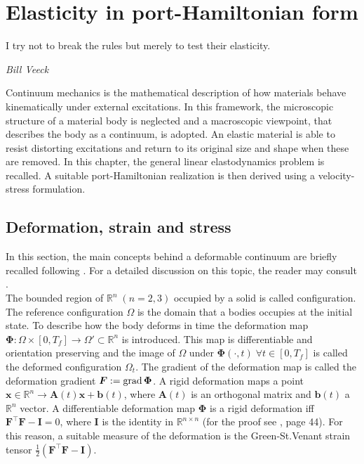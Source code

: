 \chapter{Elasticity in port-Hamiltonian form}

\epigraph{I try not to break the rules but merely to test their elasticity.}{\textit{Bill Veeck}}
\minitoc

Continuum mechanics is the mathematical description of how materials behave kinematically under external excitations. In this framework, the microscopic structure of a material body is neglected and a macroscopic viewpoint, that describes the body as a continuum, is adopted. An elastic material is able to resist distorting excitations and return to its original size and shape when these are removed. In this chapter, the general linear elastodynamics problem is recalled. A suitable port-Hamiltonian realization is then derived using a velocity-stress formulation.

\section{Deformation, strain and stress}
In this section, the main concepts behind a deformable continuum are briefly recalled following \cite{lee2012mixed}. For a detailed discussion on this topic, the reader may consult \cite{heinbockel2001introduction,landau2012elasticity}. \\

The bounded region of $\mathbb{R}^n \; (n=2, 3)$ occupied by a solid is called configuration. The reference configuration $\Omega$ is the domain that a bodies occupies at the initial state. To describe how the body deforms in time the deformation map $\bm\Phi: \Omega \times [0, T_f] \rightarrow \Omega' \subset \mathbb{R}^n$ is introduced. This map is differentiable and orientation preserving and the image of $\Omega$ under $\bm\Phi(\cdot, t) \; \forall t \in [0, T_f]$ is called the deformed configuration $\Omega_t$. The gradient of the deformation map is called the deformation gradient $\bm{F}:=\operatorname*{grad}\bm{\Phi}$. A rigid deformation maps a point $\bm{x} \in \mathbb{R}^n \rightarrow \bm{A}(t) \bm{x} + \bm{b}(t)$, where $\bm{A}(t)$ is an orthogonal matrix and $\bm{b}(t)$ a $\mathbb{R}^n$ vector. A differentiable deformation map $\bm\Phi$ is a rigid deformation iff $\bm{F}^\top \bm{F} - \bm{I} = 0$,  where $\bm{I}$ is the identity in $\mathbb{R}^{n\times n}$ (for the proof see \cite{ciarlet1988mathematical}, page 44). For this reason, a suitable measure of the deformation is the Green-St.Venant strain tensor $\frac{1}{2} (\bm{F}^\top \bm{F} - \bm{I})$.  \\

